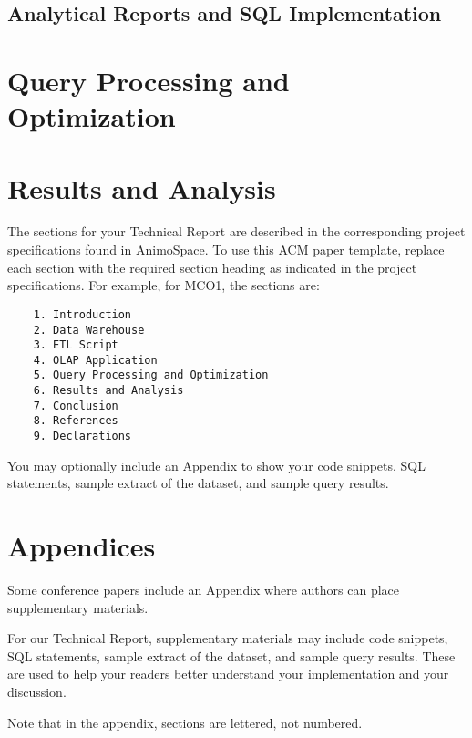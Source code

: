 \documentclass[sigconf, pbalance]{acmart}
\begin{document}
\subsection{Analytical Reports and SQL Implementation}

\section{Query Processing and Optimization}

\section{Results and Analysis}

The sections for your Technical Report are described in the corresponding project specifications found in AnimoSpace. 
To use this ACM paper template, replace each section with the required section heading as indicated in the project specifications. For example, for MCO1, the sections are:
\begin{verbatim}
    1. Introduction
    2. Data Warehouse
    3. ETL Script
    4. OLAP Application
    5. Query Processing and Optimization
    6. Results and Analysis
    7. Conclusion
    8. References
    9. Declarations
\end{verbatim}

You may optionally include an Appendix to show your code snippets, SQL statements, sample extract of the dataset, and sample query results.








\appendix

\section{Appendices}
Some conference papers include an Appendix where authors can place supplementary materials. 

For our Technical Report, supplementary materials may include code snippets, SQL statements, sample extract of the dataset, and sample query results. These are used to help your readers better understand your implementation and your discussion.

Note that in the appendix, sections are lettered, not
numbered. 
\end{document}
